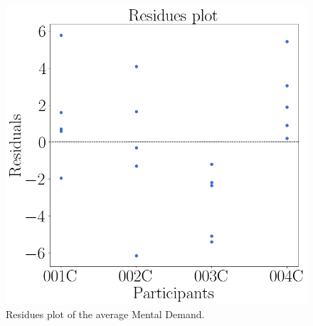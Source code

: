 \begin{figure}[!htb]
\begin{minipage}{0.45\linewidth}
                \includegraphics[width = \linewidth]{Resultados/Nasa/Figuras/png/residplot_md_avg.png}
                \caption{Residues plot of the average Mental Demand.}
                \label{fig:residual_md_average}
            \end{minipage}
        \end{figure}

    \FloatBarrier

